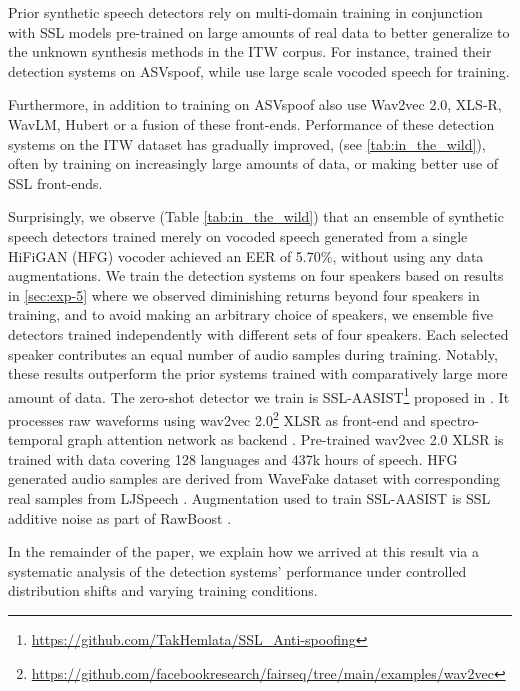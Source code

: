 Prior synthetic speech detectors rely on multi-domain training in conjunction with SSL models pre-trained on large amounts of real data to better generalize to the unknown synthesis methods in the ITW corpus. For instance, \cite{müller2024doesaudiodeepfakedetection,lu2023oneclassknowledgedistillationspoofing,pascu2024generalisablecalibratedsyntheticspeech} trained their detection systems on ASVspoof, while \citet{wang2023largescalevocodedspoofeddata} use large scale vocoded speech for training. 

Furthermore, in addition to training on ASVspoof \citet{wang2023detectioncrossdatasetfakeaudio, yi2023audiodeepfakedetectionsurvey,yang2024robustaudiodeepfakedetection,kulkarni24_asvspoof,lu2023oneclassknowledgedistillationspoofing,pascu2024generalisablecalibratedsyntheticspeech} also use Wav2vec 2.0, XLS-R, WavLM, Hubert or a fusion of these front-ends. Performance of these detection systems on the ITW dataset has gradually improved, (see \autoref{tab:in_the_wild}), often by training on increasingly large amounts of data, or making better use of SSL front-ends.

Surprisingly, we observe (Table \ref{tab:in_the_wild}) that an ensemble of synthetic speech detectors trained merely on vocoded speech generated from a single HiFiGAN (HFG) vocoder achieved an EER of 5.70\%, without using any data augmentations. We train the detection systems on four speakers based on results in \autoref{sec:exp-5} where we observed diminishing returns beyond four speakers in training, and to avoid making an arbitrary choice of speakers, we ensemble five detectors trained independently with different sets of four speakers. Each selected speaker contributes an equal number of audio samples during training. Notably, these results outperform the prior systems trained with comparatively large more amount of data. The zero-shot detector we train is SSL-AASIST\footnote{\url{https://github.com/TakHemlata/SSL_Anti-spoofing}} proposed in \citet{tak2022automaticspeakerverificationspoofing}. It processes raw waveforms using wav2vec 2.0\footnote{\url{https://github.com/facebookresearch/fairseq/tree/main/examples/wav2vec}} XLSR \cite{babu2021xlsrselfsupervisedcrosslingualspeech} as front-end and spectro-temporal graph attention network as backend \cite{jung2021aasistaudioantispoofingusing}. Pre-trained wav2vec 2.0 XLSR is trained with data covering 128 languages and 437k hours of speech. HFG generated audio samples are derived from WaveFake \cite{frank2021wavefakedatasetfacilitate} dataset with corresponding real samples from LJSpeech \cite{ljspeech17}. Augmentation used to train SSL-AASIST is SSL additive noise as part of RawBoost \cite{tak2022rawboostrawdataboosting}. 



In the remainder of the paper, we explain how we arrived at this result via a systematic analysis of the detection systems' performance under controlled distribution shifts and varying training conditions. 
